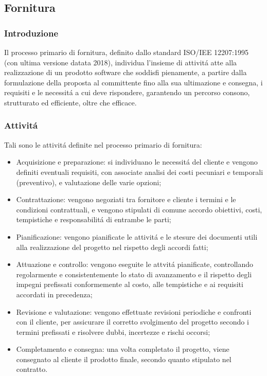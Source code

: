 
\subsection{Fornitura}
\subsubsection{Introduzione}
Il processo primario di fornitura, definito dallo standard ISO/IEE 12207:1995 (con ultima versione datata 2018), individua l'insieme di attivitá atte alla realizzazione di un prodotto software che soddisfi pienamente, a partire dalla formulazione della proposta al committente fino alla sua ultimazione e consegna, i requisiti e le necessitá a cui deve rispondere, garantendo un percorso consono, strutturato ed efficiente, oltre che efficace.

\subsubsection{Attivitá}
Tali sono le attivitá definite nel processo primario di fornitura:

\begin{itemize}
    \item Acquisizione e preparazione: si individuano le necessitá del cliente e vengono definiti eventuali requisiti, con associate analisi dei costi pecuniari e temporali (preventivo), e valutazione delle varie opzioni;
    \item Contrattazione: vengono negoziati tra fornitore e cliente i termini e le condizioni contrattuali, e vengono stipulati di comune accordo obiettivi, costi, tempistiche e responsabilitá di entrambe le parti;
    \item Pianificazione: vengono pianificate le attivitá e le stesure dei documenti utili alla realizzazione del progetto nel rispetto degli accordi fatti;
    \item Attuazione e controllo: vengono eseguite le attvitá pianificate, controllando regolarmente e consistentemente lo stato di avanzamento e il rispetto degli impegni prefissati conformemente al costo, alle tempistiche e ai requisiti accordati in precedenza;
    \item Revisione e valutazione: vengono effettuate revisioni periodiche e confronti con il cliente, per assicurare il corretto svolgimento del progetto secondo i termini prefissati e risolvere dubbi, incertezze e rischi occorsi;
    \item Completamento e consegna: una volta completato il progetto, viene consegnato al cliente il prodotto finale, secondo quanto stipulato nel contratto.
\end{itemize}
